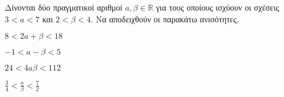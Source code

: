 Δίνονται δύο πραγματικοί αριθμοί $ a,\beta\in\mathbb{R} $ για τους οποίους ισχύουν οι σχέσεις $ 3<a<7 $ και $ 2<\beta<4 $. Να αποδειχθούν οι παρακάτω ανισότητες.
\begin{multicols}{2}
\begin{alist}
\item $ 8<2a+\beta<18 $
\item $ -1<a-\beta<5 $
\item $ 24<4a\beta<112 $
\item $ \frac{3}{4}<\frac{a}{\beta}<\frac{7}{2} $
\end{alist}
\end{multicols}
